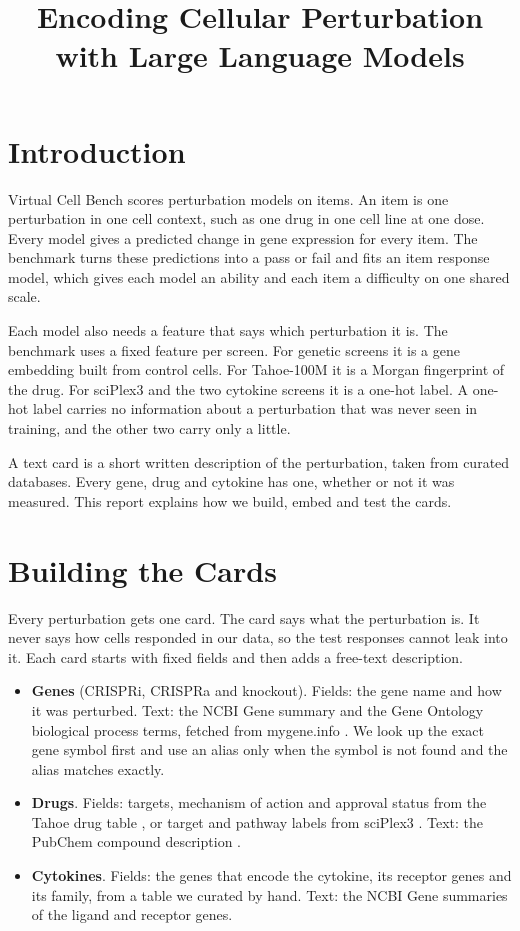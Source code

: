 \documentclass[]{style}
\title{\fontsize{0.6cm}{0.72cm}\selectfont Encoding Cellular Perturbation\\[0.3cm] with Large Language Models}
\begin{document}
\maketitle

\section{Introduction}

Virtual Cell Bench \citep{companion} scores perturbation models on items. An item is one perturbation in one cell
context, such as one drug in one cell line at one dose. Every model gives a predicted change in gene expression for every
item. The benchmark turns these predictions into a pass or fail and fits an item response model, which gives each model
an ability and each item a difficulty on one shared scale.

Each model also needs a feature that says which perturbation it is. The benchmark uses a fixed feature per screen. For
genetic screens it is a gene embedding built from control cells. For Tahoe-100M it is a Morgan fingerprint of the drug.
For sciPlex3 and the two cytokine screens it is a one-hot label. A one-hot label carries no information about a
perturbation that was never seen in training, and the other two carry only a little.

A text card is a short written description of the perturbation, taken from curated databases. Every gene, drug and
cytokine has one, whether or not it was measured. This report explains how we build, embed and test the cards.

\section{Building the Cards}

Every perturbation gets one card. The card says what the perturbation is. It never says how cells responded in our data,
so the test responses cannot leak into it. Each card starts with fixed fields and then adds a free-text description.

\begin{itemize}[leftmargin=*,itemsep=1pt,topsep=2pt]
\item \textbf{Genes} (CRISPRi, CRISPRa and knockout). Fields: the gene name and how it was perturbed. Text: the NCBI
Gene summary and the Gene Ontology biological process terms, fetched from mygene.info \citep{mygene}. We look up the
exact gene symbol first and use an alias only when the symbol is not found and the alias matches exactly.
\item \textbf{Drugs}. Fields: targets, mechanism of action and approval status from the Tahoe drug table \citep{tahoe},
or target and pathway labels from sciPlex3 \citep{srivatsan2020}. Text: the PubChem compound description
\citep{pubchem}.
\item \textbf{Cytokines}. Fields: the genes that encode the cytokine, its receptor genes and its family, from a table we
curated by hand. Text: the NCBI Gene summaries of the ligand and receptor genes.
\end{itemize}
\end{document}
